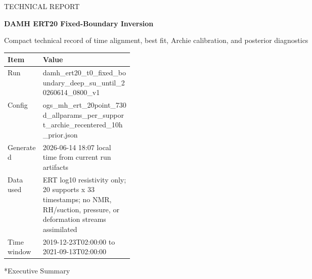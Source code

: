 \documentclass[10pt]{article}
\makeatletter
\renewcommand{\section}{\@startsection{section}{1}{0pt}{1.2em}{0.6em}{\large\bfseries\color{HeadingBlue}}}
\makeatother
\begin{document}
{\footnotesize\textcolor{Muted}{TECHNICAL REPORT}}\par
{\LARGE\bfseries DAMH ERT20 Fixed-Boundary Inversion}\par
{\normalsize\textcolor{Muted}{Compact technical record of time alignment, best fit, Archie calibration, and posterior diagnostics}}\par
\vspace{0.5em}

\begin{table}[H]
\centering
\small
\begin{tabularx}{\linewidth}{>{\raggedright\arraybackslash}p{0.29\linewidth} X}
\toprule
\rowcolor{TableFill}\textbf{Item} & \textbf{Value}\\
\midrule
Run & damh\_\allowbreak{}ert20\_\allowbreak{}t0\_\allowbreak{}fixed\_\allowbreak{}boundary\_\allowbreak{}deep\_\allowbreak{}su\_\allowbreak{}until\_\allowbreak{}20260614\_\allowbreak{}0800\_\allowbreak{}v1 \\
Config & ogs\_\allowbreak{}mh\_\allowbreak{}ert\_\allowbreak{}20point\_\allowbreak{}730d\_\allowbreak{}allparams\_\allowbreak{}per\_\allowbreak{}support\_\allowbreak{}archie\_\allowbreak{}recentered\_\allowbreak{}10h\_\allowbreak{}prior.json \\
Generated & 2026-06-14 18:07 local time from current run artifacts \\
Data used & ERT log10 resistivity only; 20 supports x 33 timestamps; no NMR, RH/suction, pressure, or deformation streams assimilated \\
Time window & 2019-12-23T02:00:00 to 2021-09-13T02:00:00 \\
\bottomrule
\end{tabularx}
\end{table}


\section*{Executive Summary}

\vspace{0.3em}
\noindent{}
\vspace{0.5em}
\end{document}
